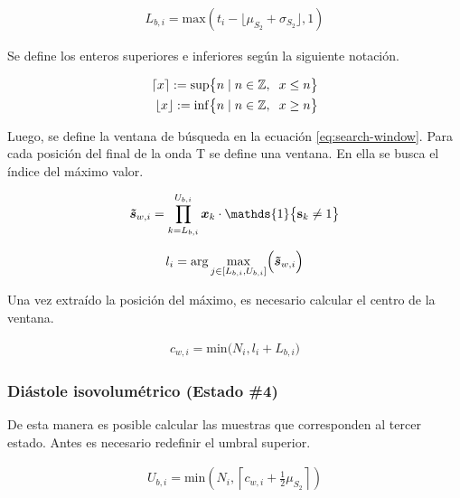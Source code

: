 \begin{align}
    L_{b,i} = \mathrm{max}(t_i-\lfloor \mu_{S_2} + \sigma_{S_2} \rfloor,1)
\end{align}

\indent Se define los enteros superiores e inferiores según la siguiente notación.

\begin{align*}
    \lceil x \rceil := \mathrm{sup}\big\{n \; | \; n \in \mathbb{Z}, \hspace{2mm} x \leq n\big\} \\
    \lfloor x \rfloor := \mathrm{inf}\big\{n \; | \; n \in \mathbb{Z}, \hspace{2mm} x \geq n\big\}
\end{align*}

\indent Luego, se define la ventana de búsqueda en la ecuación \ref{eq:search-window}. Para cada posición del final de la onda T se define una ventana. En ella se busca el índice del máximo valor.

\begin{align}
    \label{eq:search-window}
    \bm{\Tilde{s}}_{w,i} = \prod_{k=L_{b,i}}^{U_{b,i}} \bm{x}_k \cdot \mathds{1}\big\{\mathbf{s}_k \neq 1\big\}
\end{align}

\begin{align}
    l_i = \arg \underset{j \in [L_{b,i},U_{b,i}]}{\mathrm{max}} \Big(\bm{\Tilde{s}}_{w,i}\Big)
\end{align}

\indent Una vez extraído la posición del máximo, es necesario calcular el centro de la ventana.

\begin{align}
    c_{w,i} = \mathrm{min}\Big(N_i,l_i+L_{b,i}\Big)
\end{align}

\subsubsection*{Diástole isovolumétrico (Estado \#4)}

\indent De esta manera es posible calcular las muestras que corresponden al tercer estado. Antes es necesario redefinir el umbral superior.

\begin{align}
    U_{b,i} = \mathrm{min}\left(N_i, \left\lceil  c_{w,i} + \frac{1}{2}\mu_{S_2} \right\rceil \right)
\end{align}


